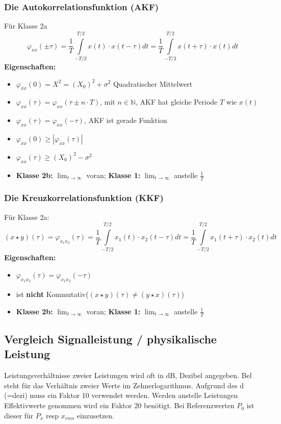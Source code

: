 \subsubsection*{Die Autokorrelationsfunktion (AKF)}
Für Klasse 2a
$$ \varphi_{xx}(\pm \tau) = \frac{1}{T} \int \limits _{-T/2} ^{T/2} x(t) \cdot x(t- \tau) dt
  = \frac{1}{T} \int \limits _{-T/2} ^{T/2} x(t + \tau) \cdot x(t)dt$$
\textbf{Eigenschaften:}
\begin{itemize}
  \item $\varphi_{xx}(0) = X^2 = (X_0)^2 + \sigma^2$ \tiny Quadratischer Mittelwert \normalsize
  \item $\varphi_{xx}(\tau) = \varphi_{xx}(\tau \pm n \cdot T)$, mit $n \in \mathbb{N}$,
        AKF hat gleiche Periode $T$ wie $x(t)$
  \item $\varphi_{xx}(\tau) = \varphi_{xx}(-\tau)$, AKF ist gerade Funktion
  \item $\varphi_{xx}(0) \geq \left|\varphi_{xx}(\tau)\right|$
  \item $\varphi_{xx}(\tau) \geq (X_0)^2 - \sigma^2$
  \item \textbf{Klasse 2b:} $\lim_{t \to \infty}$ voran; \textbf{Klasse 1:} $\lim_{t \to \infty}$ anstelle $\frac{1}{T}$
\end{itemize}

\subsubsection*{Die Kreuzkorrelationsfunktion (KKF)}
Für Klasse 2a:
$$ (x \star y)(\tau) = \varphi_{x_1x_2}(\tau) = \frac{1}{T} \int \limits _{-T/2} ^{T/2} x_1(t) \cdot x_2(t- \tau) dt
  = \frac{1}{T} \int \limits _{-T/2} ^{T/2} x_1(t + \tau) \cdot x_2(t)dt$$
\textbf{Eigenschaften:}
\begin{itemize}
  \item  $\varphi_{x_1x_2}(\tau) = \varphi_{x_1x_2}(-\tau)$
  \item ist \textbf{nicht} Kommutativ($(x \star y)(\tau) \neq (y \star x)(\tau)$)
  \item \textbf{Klasse 2b:} $\lim_{t \to \infty}$ voran; \textbf{Klasse 1:} $\lim_{t \to \infty}$ anstelle $\frac{1}{T}$
\end{itemize}


\subsection{Vergleich Signalleistung / physikalische Leistung}
Leistungsverhältnisse zweier Leistungen wird oft in dB, Dezibel angegeben.
Bel steht für das Verhältnis zweier Werte im Zehnerlogarithmus.
Aufgrund des d (=dezi) muss ein Faktor 10 verwendet werden.
Werden anstelle Leistungen Effektivwerte genommen wird ein Faktor 20 benötigt.
Bei Referenzwerten $P_0$ ist dieser für $P_x$ resp $x_{rms}$ einzusetzen.

